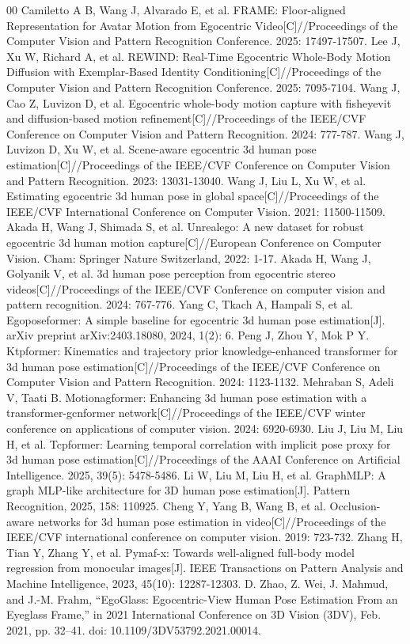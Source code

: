 \documentclass[conference]{IEEEtran}
\begin{document}
\begin{thebibliography}{00}
 Camiletto A B, Wang J, Alvarado E, et al. FRAME: Floor-aligned Representation for Avatar Motion from Egocentric Video[C]//Proceedings of the Computer Vision and Pattern Recognition Conference. 2025: 17497-17507.
 Lee J, Xu W, Richard A, et al. REWIND: Real-Time Egocentric Whole-Body Motion Diffusion with Exemplar-Based Identity Conditioning[C]//Proceedings of the Computer Vision and Pattern Recognition Conference. 2025: 7095-7104.
 Wang J, Cao Z, Luvizon D, et al. Egocentric whole-body motion capture with fisheyevit and diffusion-based motion refinement[C]//Proceedings of the IEEE/CVF Conference on Computer Vision and Pattern Recognition. 2024: 777-787.
 Wang J, Luvizon D, Xu W, et al. Scene-aware egocentric 3d human pose estimation[C]//Proceedings of the IEEE/CVF Conference on Computer Vision and Pattern Recognition. 2023: 13031-13040.
 Wang J, Liu L, Xu W, et al. Estimating egocentric 3d human pose in global space[C]//Proceedings of the IEEE/CVF International Conference on Computer Vision. 2021: 11500-11509.
 Akada H, Wang J, Shimada S, et al. Unrealego: A new dataset for robust egocentric 3d human motion capture[C]//European Conference on Computer Vision. Cham: Springer Nature Switzerland, 2022: 1-17.
 Akada H, Wang J, Golyanik V, et al. 3d human pose perception from egocentric stereo videos[C]//Proceedings of the IEEE/CVF Conference on computer vision and pattern recognition. 2024: 767-776.
 Yang C, Tkach A, Hampali S, et al. Egoposeformer: A simple baseline for egocentric 3d human pose estimation[J]. arXiv preprint arXiv:2403.18080, 2024, 1(2): 6.
 Peng J, Zhou Y, Mok P Y. Ktpformer: Kinematics and trajectory prior knowledge-enhanced transformer for 3d human pose estimation[C]//Proceedings of the IEEE/CVF Conference on Computer Vision and Pattern Recognition. 2024: 1123-1132.
 Mehraban S, Adeli V, Taati B. Motionagformer: Enhancing 3d human pose estimation with a transformer-gcnformer network[C]//Proceedings of the IEEE/CVF winter conference on applications of computer vision. 2024: 6920-6930.
 Liu J, Liu M, Liu H, et al. Tcpformer: Learning temporal correlation with implicit pose proxy for 3d human pose estimation[C]//Proceedings of the AAAI Conference on Artificial Intelligence. 2025, 39(5): 5478-5486.
 Li W, Liu M, Liu H, et al. GraphMLP: A graph MLP-like architecture for 3D human pose estimation[J]. Pattern Recognition, 2025, 158: 110925.
 Cheng Y, Yang B, Wang B, et al. Occlusion-aware networks for 3d human pose estimation in video[C]//Proceedings of the IEEE/CVF international conference on computer vision. 2019: 723-732.
 Zhang H, Tian Y, Zhang Y, et al. Pymaf-x: Towards well-aligned full-body model regression from monocular images[J]. IEEE Transactions on Pattern Analysis and Machine Intelligence, 2023, 45(10): 12287-12303.
 D. Zhao, Z. Wei, J. Mahmud, and J.-M. Frahm, “EgoGlass: Egocentric-View Human Pose Estimation From an Eyeglass Frame,” in 2021 International Conference on 3D Vision (3DV), Feb. 2021, pp. 32–41. doi: 10.1109/3DV53792.2021.00014.

\end{thebibliography}
\end{document}
